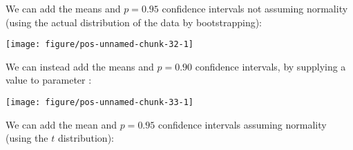\documentclass[paper=a4,10pt,div=17,headsepline,BCOR=12mm,twoside,open=right]{scrbook}\usepackage{knitr}
\begin{document}
We can add the means and $p = 0.95$ confidence intervals not assuming normality (using the actual distribution of the data by bootstrapping):

\begin{knitrout}\footnotesize
{}\color{fgcolor}\begin{kframe}
\begin{alltt}
 \hlopt{+} \hlstd{(} \hlstd{=} \hlstd{,}
                    \hlstd{=}\hlstd{,} \hlstd{=}\hlstd{,} \hlstd{=}\hlstd{)}
\end{alltt}
\end{kframe}

{\centering \texttt{[image: figure/pos-unnamed-chunk-32-1]} 

}



\end{knitrout}

We can instead add the means and $p = 0.90$ confidence intervals, by supplying a value to parameter :

\begin{knitrout}\footnotesize
{}\color{fgcolor}\begin{kframe}
\begin{alltt}
 \hlopt{+} \hlstd{(} \hlstd{=} \hlstd{,}
                     \hlstd{=} \hlstd{(} \hlstd{=} \hlstd{),}
                     \hlstd{=} \hlstd{,}  \hlstd{=} \hlstd{,}  \hlstd{=} \hlstd{)}
\end{alltt}
\end{kframe}

{\centering \texttt{[image: figure/pos-unnamed-chunk-33-1]} 

}



\end{knitrout}

We can add the mean and $p = 0.95$ confidence intervals assuming normality (using the $t$ distribution):
\end{document}
